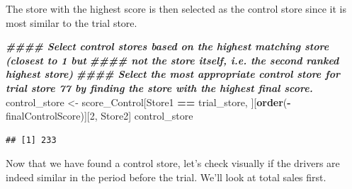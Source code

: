 \documentclass[
]{article}
\newenvironment{Shaded}{\begin{snugshade}}{\end{snugshade}}
\newcommand{\DecValTok}[1]{\textcolor[rgb]{0.00,0.00,0.81}{#1}}
\newcommand{\DocumentationTok}[1]{\textcolor[rgb]{0.56,0.35,0.01}{\textbf{\textit{#1}}}}
\newcommand{\FunctionTok}[1]{\textcolor[rgb]{0.13,0.29,0.53}{\textbf{#1}}}
\newcommand{\NormalTok}[1]{#1}
\newcommand{\OtherTok}[1]{\textcolor[rgb]{0.56,0.35,0.01}{#1}}
\newcommand{\SpecialCharTok}[1]{\textcolor[rgb]{0.81,0.36,0.00}{\textbf{#1}}}
\begin{document}
The store with the highest score is then selected as the control store
since it is most similar to the trial store.

\begin{Shaded}
\begin{Highlighting}[]
\DocumentationTok{\#\#\#\# Select control stores based on the highest matching store (closest to 1 but}
\DocumentationTok{\#\#\#\# not the store itself, i.e. the second ranked highest store)}
\DocumentationTok{\#\#\#\# Select the most appropriate control store for trial store 77 by finding the store with the highest final score.}
\NormalTok{control\_store }\OtherTok{\textless{}{-}}\NormalTok{ score\_Control[Store1 }\SpecialCharTok{==}\NormalTok{ trial\_store, ][}\FunctionTok{order}\NormalTok{(}\SpecialCharTok{{-}}\NormalTok{finalControlScore)][}\DecValTok{2}\NormalTok{, Store2]}
\NormalTok{control\_store}
\end{Highlighting}
\end{Shaded}

\begin{verbatim}
## [1] 233
\end{verbatim}

Now that we have found a control store, let's check visually if the
drivers are indeed similar in the period before the trial. We'll look at
total sales first.
\end{document}
